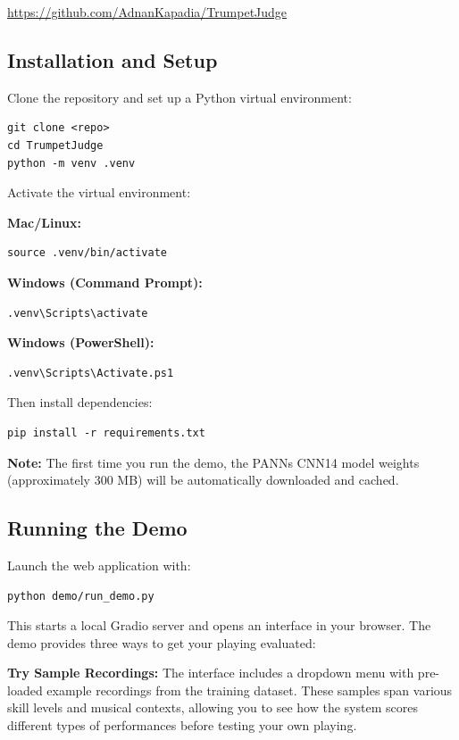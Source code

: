 \documentclass[10pt, a4paper, twocolumn]{article}
\begin{document}
\begin{center}
\url{https://github.com/AdnanKapadia/TrumpetJudge}
\end{center}

\subsection*{Installation and Setup}

Clone the repository and set up a Python virtual environment:

\begin{verbatim}
git clone <repo>
cd TrumpetJudge
python -m venv .venv
\end{verbatim}

Activate the virtual environment:

\textbf{Mac/Linux:}
\begin{verbatim}
source .venv/bin/activate
\end{verbatim}

\textbf{Windows (Command Prompt):}
\begin{verbatim}
.venv\Scripts\activate
\end{verbatim}

\textbf{Windows (PowerShell):}
\begin{verbatim}
.venv\Scripts\Activate.ps1
\end{verbatim}

Then install dependencies:

\begin{verbatim}
pip install -r requirements.txt
\end{verbatim}

\textbf{Note:} The first time you run the demo, the PANNs CNN14 model weights (approximately 300 MB) will be automatically downloaded and cached.

\subsection*{Running the Demo}

Launch the web application with:

\begin{verbatim}
python demo/run_demo.py
\end{verbatim}

This starts a local Gradio server and opens an interface in your browser. The demo provides three ways to get your playing evaluated:

\textbf{Try Sample Recordings:} The interface includes a dropdown menu with pre-loaded example recordings from the training dataset. These samples span various skill levels and musical contexts, allowing you to see how the system scores different types of performances before testing your own playing.
\end{document}
